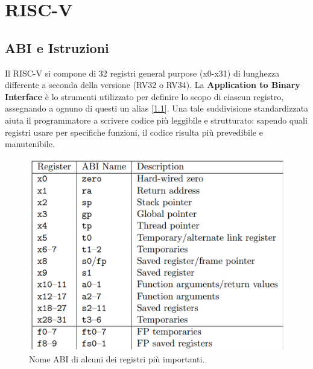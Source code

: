\chapter{RISC-V}

\section{ABI e Istruzioni}
Il RISC-V si compone di 32 registri general purpose (x0-x31) di lunghezza differente a seconda della versione (RV32 o RV34). La \textbf{Application to Binary Interface} è lo strumenti utilizzato per definire lo scopo di ciascun registro, assegnando a ognuno di questi un alias [\ref{fig:abi}]. Una tale suddivisione standardizzata aiuta il programmatore a scrivere codice più leggibile e strutturato: sapendo quali registri usare per specifiche funzioni, il codice risulta più prevedibile e manutenibile. 
\begin{figure}[!h]
	\centering
	\includegraphics[width=0.5\linewidth]{img/abi}
	\caption{Nome ABI di alcuni dei registri più importanti.}
	\label{fig:abi}
\end{figure}

